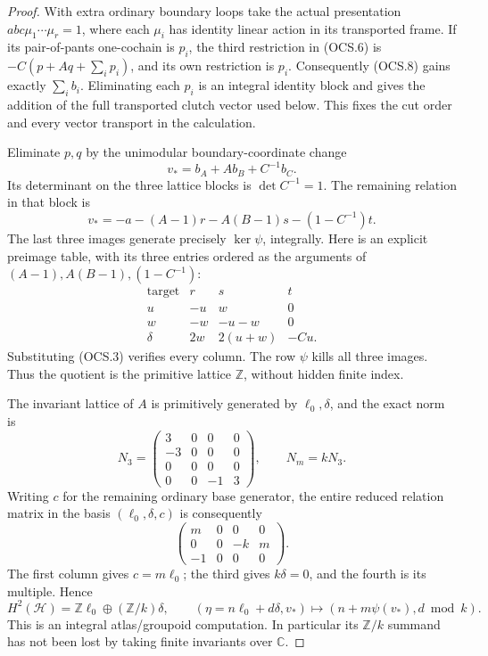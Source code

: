 \begin{proof}
With extra ordinary boundary loops take the actual presentation
\(a b c\mu_1\cdots\mu_r=1\), where each \(\mu_i\) has identity
linear action in its transported frame. If its pair-of-pants
one-cochain is \(p_i\), the third restriction in (OCS.6) is
\(-C(p+Aq+\sum_i p_i)\), and its own restriction is \(p_i\).
Consequently (OCS.8) gains exactly \(\sum_i b_i\). Eliminating
each \(p_i\) is an integral identity block and gives the addition
of the full transported clutch vector used below. This fixes the
cut order and every vector transport in the calculation.

Eliminate \(p,q\) by the unimodular boundary-coordinate change
\[
                 v_*=b_A+A b_B+C^{-1}b_C.
\tag{OCS.8}
\]
Its determinant on the three lattice blocks is \(\det C^{-1}=1\).
The remaining relation in that block is
\[
 v_*=-a-(A-1)r-A(B-1)s-(1-C^{-1})t.                   \tag{OCS.9}
\]
The last three images generate precisely \(\ker\psi\), integrally.
Here is an explicit preimage table, with its three entries ordered
as the arguments of \((A-1),A(B-1),(1-C^{-1})\):
\[
 \begin{array}{c|ccc}
 \text{target}&r&s&t\\\hline
 u&-u&w&0\\
 w&-w&-u-w&0\\
 \delta&2w&2(u+w)&-Cu.
 \end{array}                                           \tag{OCS.10}
\]
Substituting (OCS.3) verifies every column. The row \(\psi\)
kills all three images. Thus the quotient is the primitive lattice
\(\mathbb Z\), without hidden finite index.

The invariant lattice of \(A\) is primitively generated by
\(\ell_0,\delta\), and the exact norm is
\[
 N_3=\begin{pmatrix}3&0&0&0\\-3&0&0&0\\0&0&0&0\\0&0&-1&3\end{pmatrix},
 \qquad N_m=kN_3.
\tag{OCS.11}
\]
Writing \(c\) for the remaining ordinary base generator, the
entire reduced relation matrix in the basis
\((\ell_0,\delta,c)\) is consequently
\[
 \begin{pmatrix}m&0&0&0\\0&0&-k&m\\-1&0&0&0\end{pmatrix}.
\tag{OCS.12}
\]
The first column gives \(c=m\ell_0\); the third gives
\(k\delta=0\), and the fourth is its multiple. Hence
\[
 H^2(\mathcal H)=\mathbb Z\ell_0\oplus(\mathbb Z/k)\delta,
 \qquad
 (\eta=n\ell_0+d\delta,v_*)\longmapsto
                   (n+m\psi(v_*),d\bmod k).
\tag{OCS.13}
\]
This is an integral atlas/groupoid computation. In particular its
\(\mathbb Z/k\) summand has not been lost by taking finite
invariants over \(\mathbb C\).


\end{proof}
